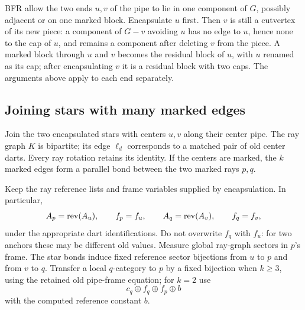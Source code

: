 BFR allow the two ends $u,v$ of the pipe to lie in one component of $G$,
possibly adjacent or on one marked block. Encapsulate $u$ first. Then $v$
is still a cutvertex of its new piece: a component of $G-v$ avoiding $u$
has no edge to $u$, hence none to the cap of $u$, and remains a component
after deleting $v$ from the piece. A marked block through $u$ and $v$
becomes the residual block of $u$, with $u$ renamed as its cap; after
encapsulating $v$ it is a residual block with two caps. The arguments
above apply to each end separately.

\subsection{Joining stars with many marked edges}

Join the two encapsulated stars with centers $u,v$ along their center
pipe. The ray graph $K$ is bipartite; its edge $\ell_d$ corresponds to a
matched pair of old center darts. Every ray rotation retains its identity.
If the centers are marked, the $k$ marked edges form a parallel bond
between the two marked rays $p,q$.

Keep the ray reference lists and frame variables supplied by
encapsulation. In particular,
\[
 A_p=\operatorname{rev}(A_u),\qquad f_p=f_u,
 \qquad A_q=\operatorname{rev}(A_v),\qquad f_q=f_v,
\]
under the appropriate dart identifications. Do not overwrite $f_q$ with
$f_u$: for two anchors these may be different old values. Measure global
ray-graph sectors in $p$'s frame. The star bonds induce fixed reference
sector bijections from $u$ to $p$ and from $v$ to $q$. Transfer a local
$q$-category to $p$ by a fixed bijection when $k\ge3$, using the retained
old pipe-frame equation; for $k=2$ use
\[
 c_q\oplus f_q\oplus f_p\oplus b
\]
with the computed reference constant $b$.

